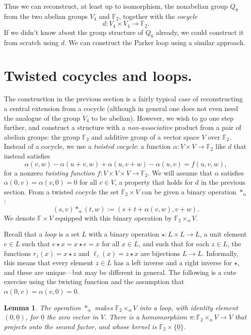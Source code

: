 \documentclass{article}
\theoremstyle{plain}
\newtheorem{lemma}{Lemma}
\theoremstyle{definition}
\def \FF {\mathbb{F}}
\begin{document}
Thus we can reconstruct, at least up to isomorphism, the nonabelian group $Q_8$ from the two abelian groups $V_4$ and $\FF_2$, together with the \emph{cocycle} 
\[
	d\colon V_4\times V_4\to \FF_2.
\]
If we didn't know about the group structure of $Q_8$ already, we could construct it from scratch using $d$.
We can construct the Parker loop using a similar approach.


\section{Twisted cocycles and loops.}

The construction in the previous section is a fairly typical case of reconstructing a central extension from a cocycle (although in general one does not even need the analogue of the group $V_4$ to be abelian). 
However, we wish to go one step further, and construct a structure with a \emph{non-associative} product from a pair of abelian groups: the group $\FF_2$ and additive group of a vector space $V$ over $\FF_2$.
Instead of a cocycle, we use a \emph{twisted cocycle}: a function $\alpha\colon V\times V \to \FF_2$ like $d$ that instead satisfies
\[
	\alpha(v,w)-\alpha(u+v,w)+\alpha(u,v+w)-\alpha(u,v) = f(u,v,w),
\]
for a nonzero \emph{twisting function} $f\colon V\times V\times V \to \FF_2$. We will assume that $\alpha$ satisfies $\alpha(0,v)=\alpha(v,0) = 0$ for all $v\in V$, a property that holds for $d$ in the previous section. From a twisted cocycle the set $\FF_2 \times V$ can be given a binary operation $\ast_\alpha$:
\[
	(s,v)\ast_\alpha(t,w):=(s+ t+ \alpha(v,w),v+w).
\]
We denote $\FF \times V$ equipped with this binary operation by $\FF_2\times_\alpha V$.

Recall that a \emph{loop} is a set $L$ with a binary operation $\star\colon L\times L \to L$, a unit element $e\in L$ such that $e\star x = x \star e = x$ for all $x\in L$, and such that for each $z\in L$, the functions $r_z(x) = x \star z$ and $\ell_z(x)=z\star x$ are bijections $L\to L$. 
Informally, this means that every element $z\in L$ has a left inverse and a right inverse for $\star$, and these are unique---but may be different in general. 
The following is a cute exercise using the twisting function and the assumption that $\alpha(0,v)=\alpha(v,0)=0$.

\begin{lemma}
The operation $\ast_\alpha$ makes $\FF_2\times_\alpha V$ into a loop, with identity element $(0,\underline{0})$, for $\underline{0}$ the zero vector in $V$.
There is a homomorphism $\pi\colon \FF_2\times_\alpha V \to V$ that projects onto the second factor, and whose kernel is $\FF_2 \times\{\underline{0}\}$.
\end{lemma}
\end{document}
